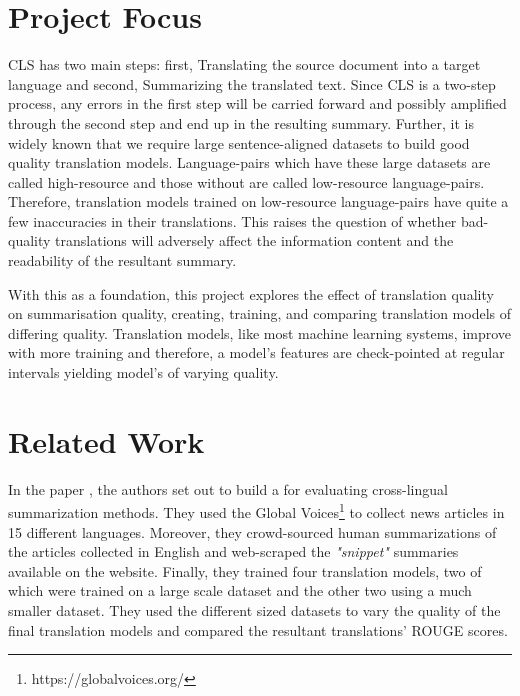 \documentclass[12pt,a4paper,twoside,openright]{report}
\begin{document}
\section{Project Focus}
\label{project-focus}

CLS has two main steps: first, Translating the source document into a target language and second, Summarizing the translated text. Since CLS is a two-step process, any errors in the first step will be carried forward and possibly amplified through the second step and end up in the resulting summary. Further, it is widely known that we require large sentence-aligned datasets to build good quality translation models. Language-pairs which have these large datasets are called high-resource and those without are called low-resource language-pairs. Therefore, translation models trained on low-resource language-pairs have quite a few inaccuracies in their translations. This raises the question of whether bad-quality translations will adversely affect the information content and the readability of the resultant summary. 

With this as a foundation, this project explores the effect of translation quality on summarisation quality, creating, training, and comparing translation models of differing quality. Translation models, like most machine learning systems, improve with more training and therefore, a model's features are check-pointed at regular intervals yielding model's of varying quality. 

\section{Related Work}
\label{related-work}
In the paper \cite{nguyen-daume-iii-2019-global}, the authors set out to build a for evaluating cross-lingual summarization methods. They used the Global Voices\footnote{https://globalvoices.org/} to collect news articles in 15 different languages. Moreover, they crowd-sourced human summarizations of the articles collected in English and web-scraped the \textit{"snippet"} summaries available on the website. Finally, they trained four translation models, two of which were trained on a large scale dataset and the other two using a much smaller dataset. They used the different sized datasets to vary the quality of the final translation models and compared the resultant translations' ROUGE scores. 
\end{document}
